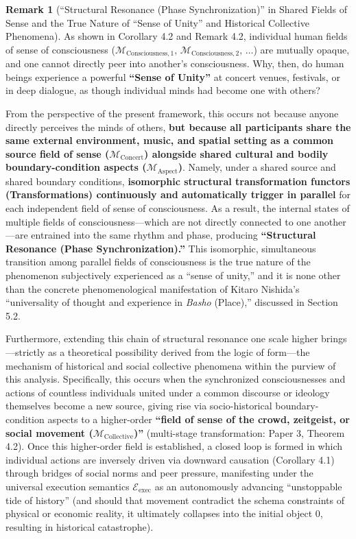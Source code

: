\documentclass[11pt,a4paper]{article}
\theoremstyle{definition}
\newtheorem{remark}{Remark}[section]
\theoremstyle{plain}
\begin{document}
\begin{remark}[``Structural Resonance (Phase Synchronization)'' in Shared Fields of Sense and the True Nature of ``Sense of Unity'' and Historical Collective Phenomena]
As shown in Corollary 4.2 and Remark 4.2, individual human fields of sense of consciousness ($\mathcal{M}_{\mathrm{Consciousness}, 1},\, \mathcal{M}_{\mathrm{Consciousness}, 2},\, \dots$) are mutually opaque, and one cannot directly peer into another's consciousness. Why, then, do human beings experience a powerful \textbf{``Sense of Unity''} at concert venues, festivals, or in deep dialogue, as though individual minds had become one with others?

From the perspective of the present framework, this occurs not because anyone directly perceives the minds of others, \textbf{but because all participants share the same external environment, music, and spatial setting as a common source field of sense ($\mathcal{M}_{\mathrm{Concert}}$) alongside shared cultural and bodily boundary-condition aspects ($\mathcal{M}_{\mathrm{Aspect}}$)}. Namely, under a shared source and shared boundary conditions, \textbf{isomorphic structural transformation functors (Transformations) continuously and automatically trigger in parallel} for each independent field of sense of consciousness. As a result, the internal states of multiple fields of consciousness---which are not directly connected to one another---are entrained into the same rhythm and phase, producing \textbf{``Structural Resonance (Phase Synchronization).''} This isomorphic, simultaneous transition among parallel fields of consciousness is the true nature of the phenomenon subjectively experienced as a ``sense of unity,'' and it is none other than the concrete phenomenological manifestation of Kitaro Nishida's ``universality of thought and experience in \textit{Basho} (Place),'' discussed in Section 5.2.

Furthermore, extending this chain of structural resonance one scale higher brings---strictly as a theoretical possibility derived from the logic of form---the mechanism of historical and social collective phenomena within the purview of this analysis. Specifically, this occurs when the synchronized consciousnesses and actions of countless individuals united under a common discourse or ideology themselves become a new source, giving rise via socio-historical boundary-condition aspects to a higher-order \textbf{``field of sense of the crowd, zeitgeist, or social movement ($\mathcal{M}_{\mathrm{Collective}}$)''} (multi-stage transformation: Paper 3, Theorem 4.2). Once this higher-order field is established, a closed loop is formed in which individual actions are inversely driven via downward causation (Corollary 4.1) through bridges of social norms and peer pressure, manifesting under the universal execution semantics $\mathcal{E}_{\mathrm{exec}}$ as an autonomously advancing ``unstoppable tide of history'' (and should that movement contradict the schema constraints of physical or economic reality, it ultimately collapses into the initial object $0$, resulting in historical catastrophe).
\end{remark}
\end{document}
